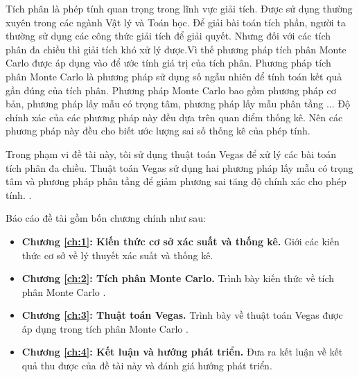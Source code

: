 \startintroduction
\fancyhead[L]{}
Tích phân là phép tính quan trọng trong lĩnh vực giải tích. Được sử dụng thường xuyên
trong các ngành Vật lý và Toán học. Để giải bài toán tích phần, người ta thường sử dụng các công thức giải tích để giải quyết.
Nhưng đối với các tích phân đa chiều thì giải tích khó xử lý được.Vì thế phương pháp tích phân
Monte Carlo được áp dụng vào để ước tính giá trị của tích phân. Phương pháp tích phân Monte Carlo
là phương pháp sử dụng số ngẫu nhiên để tính toán kết quả gần đúng của tích phân. Phương pháp Monte Carlo bao gồm phương pháp 
cơ bản, phương pháp lấy mẫu có trọng tâm, phương pháp lấy mẫu phân tầng ... Độ chính xác của các phương pháp này đều dựa trên quan điểm thống kê. 
Nên các phương pháp này đều cho biết ước lượng sai số thống kê của phép tính. \par
Trong phạm vi đề tài này, tôi sử dụng thuật toán Vegas để xử lý các bài toán tích phân đa chiều.
Thuật toán Vegas sử dụng hai phương pháp lấy mẫu có trọng tâm và phương pháp phân tầng để giảm phương sai tăng độ chính xác cho phép tính.
.\par
Báo cáo đề tài gồm bốn chương chính như sau:\par
\clearpage 
\begin{itemize}
 \item \textbf{Chương \ref{ch:1}: Kiến thức cơ sở xác suất và thống kê.} Giới các kiến thức cơ sở về lý thuyết xác suất và thống kê.
 \item \textbf{Chương \ref{ch:2}: Tích phân Monte Carlo.} Trình bày kiến thức về tích phân Monte Carlo .
 \item \textbf{Chương \ref{ch:3}: Thuật toán Vegas.} Trình bày về thuật toán Vegas được áp dụng trong tích phân Monte Carlo .
 \item \textbf{Chương \ref{ch:4}: Kết luận và hướng phát triển.} Đưa ra kết luận về kết quả thu được của đề tài này
 và đánh giá hướng phát triển.
\end{itemize}
